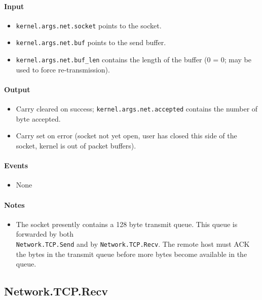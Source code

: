 \paragraph{Input}
\begin{itemize}
\item \verb+kernel.args.net.socket+ points to the socket.
\item \verb+kernel.args.net.buf+ points to the send buffer.
\item \verb+kernel.args.net.buf_len+ contains the length of the buffer (0 = 0; may be used to force re-transmission).
\end{itemize}

\paragraph{Output}

\begin{itemize}
\item Carry cleared on success; \verb+kernel.args.net.accepted+ contains the number of byte accepted.
\item Carry set on error (socket not yet open, user has closed this side of the socket, kernel is out of packet buffers).
\end{itemize}

\paragraph{Events}

\begin{itemize}
\item None
\end{itemize}

\paragraph{Notes}

\begin{itemize}
\item The socket presently contains a 128 byte transmit queue.  This queue is forwarded by both \\ \verb+Network.TCP.Send+ and by \verb+Network.TCP.Recv+.  The remote host must ACK the bytes in the transmit queue before more bytes become available in the queue.
\end{itemize}


\subsection*{Network.TCP.Recv}

